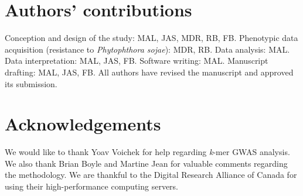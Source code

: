 \section*{Authors' contributions}
\label{sv-gwas-contributions}

Conception and design of the study: MAL, JAS, MDR, RB, FB.
Phenotypic data acquisition (resistance to \textit{Phytophthora sojae}): MDR, RB.
Data analysis: MAL.
Data interpretation: MAL, JAS, FB.
Software writing: MAL.
Manuscript drafting: MAL, JAS, FB.
All authors have revised the manuscript and approved its submission.

\section*{Acknowledgements}
\label{sv-gwas-acknowledgwments}

We would like to thank Yoav Voichek for help regarding \textit{k}-mer GWAS
analysis.  We also thank Brian Boyle and Martine Jean for valuable comments
regarding the methodology. We are thankful to the Digital Research Alliance of
Canada for using their high-performance computing servers.




